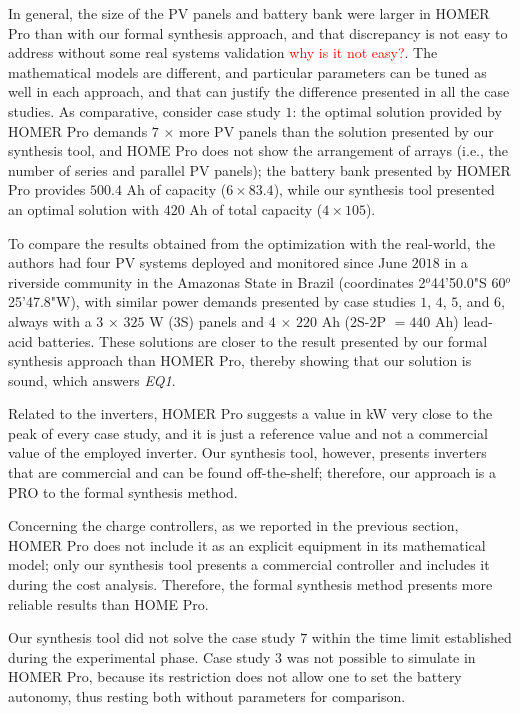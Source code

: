 \documentclass[journal]{IEEEtran}
\begin{document}
In general, the size of the PV panels and battery bank were larger in HOMER Pro than with our formal synthesis approach,  and that discrepancy is not easy to address without some real systems validation \textcolor{red}{why is it not easy?}. The mathematical models are different, and particular parameters can be tuned as well in each approach, and that can justify the difference presented in all the case studies. As comparative, consider case study $1$: the optimal solution provided by HOMER Pro demands $7$ $\times$ more PV panels than the solution presented by our synthesis tool, and HOME Pro does not show the arrangement of arrays (i.e., the number of series and parallel PV panels); the battery bank presented by HOMER Pro provides $500.4$ Ah of capacity ($6 \times 83.4$), while our synthesis tool presented an optimal solution with $420$ Ah of total capacity ($4 \times 105$). 

To compare the results obtained from the optimization with the real-world, the authors had four PV systems deployed and monitored since June $2018$ in a riverside community in the Amazonas State in Brazil (coordinates 2$^{o}$44'50.0"S 60$^{o}$25'47.8"W), with similar power demands presented by case studies $1$, $4$, $5$, and $6$, 
always with a $3$ $\times$ $325$ W ($3$S) panels and $4$ $\times$ $220$ Ah ($2$S-$2$P $= 440$ Ah) lead-acid batteries. These solutions are closer to the result presented by our formal synthesis approach than HOMER Pro, thereby showing that our solution is sound, which answers \textit{EQ1}.

Related to the inverters, HOMER Pro suggests a value in kW very close to the peak of every case study, and it is just a reference value and not a commercial value of the employed inverter. Our synthesis tool, however, 
presents inverters that are commercial and can be found off-the-shelf; therefore, our approach is a PRO to the formal synthesis method.

Concerning the charge controllers, as we reported in the previous section, HOMER Pro does not include it as an explicit equipment in its mathematical model; only our synthesis tool presents a commercial controller and includes it during the cost analysis. Therefore, the formal synthesis method presents more reliable results than HOME Pro.

Our synthesis tool did not solve the case study $7$  within the time limit established during the experimental phase. Case study $3$ was not possible to simulate in HOMER Pro, because its restriction does not allow one to set the battery autonomy, thus resting both without parameters for comparison.
\end{document}
